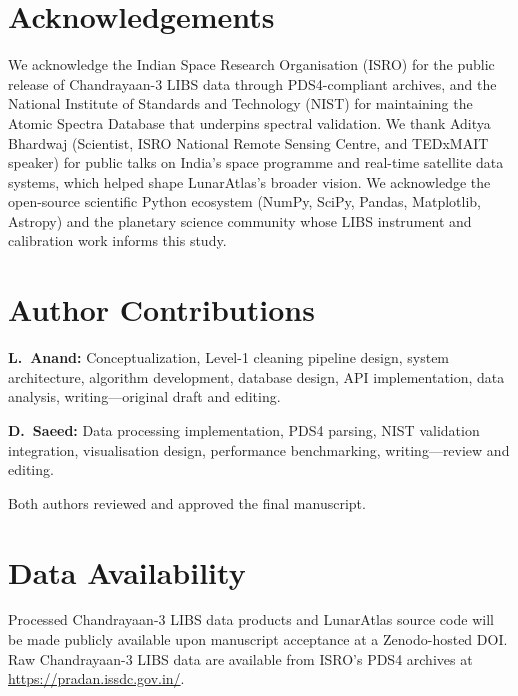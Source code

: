 \documentclass[a4paper,twocolumn,10pt]{article}
\begin{document}
\section*{Acknowledgements}

We acknowledge the Indian Space Research Organisation (ISRO) for the
public release of Chandrayaan-3 LIBS data through PDS4-compliant
archives, and the National Institute of Standards and Technology
(NIST) for maintaining the Atomic Spectra Database that underpins
spectral validation.  We thank Aditya Bhardwaj (Scientist, ISRO
National Remote Sensing Centre, and TEDxMAIT speaker) for public
talks on India's space programme and real-time satellite data
systems, which helped shape LunarAtlas's broader vision.  We
acknowledge the open-source scientific Python ecosystem (NumPy,
SciPy, Pandas, Matplotlib, Astropy) and the planetary science
community whose LIBS instrument and calibration work informs this
study.


\section*{Author Contributions}

\textbf{L.~Anand:} Conceptualization, Level-1 cleaning pipeline
design, system architecture, algorithm development, database design,
API implementation, data analysis, writing---original draft and
editing.

\textbf{D.~Saeed:} Data processing implementation, PDS4 parsing,
NIST validation integration, visualisation design, performance
benchmarking, writing---review and editing.

Both authors reviewed and approved the final manuscript.


\section*{Data Availability}

Processed Chandrayaan-3 LIBS data products and LunarAtlas source code
will be made publicly available upon manuscript acceptance at a
Zenodo-hosted DOI.  Raw Chandrayaan-3 LIBS data are available from
ISRO's PDS4 archives at \url{https://pradan.issdc.gov.in/}.
\end{document}
